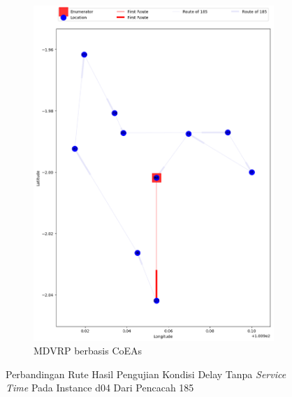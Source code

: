 \begin{figure}[H]
	\centering
	\begin{subfigure}[t]{\textwidth}
		\centering
		\includegraphics[width=\textwidth]{Resources/Images/delayed_5/real_m15_n100_delayed_5_185_coes}
		\caption{MDVRP berbasis CoEAs}
		\label{fig:real_m15_n100_delayed_5_185_coes}
	\end{subfigure}
	\caption{Perbandingan Rute Hasil Pengujian Kondisi Delay Tanpa \textit{Service Time} Pada Instance d04 Dari Pencacah 185}
	\label{fig:real_m15_n100_delayed_5_185}
\end{figure}


